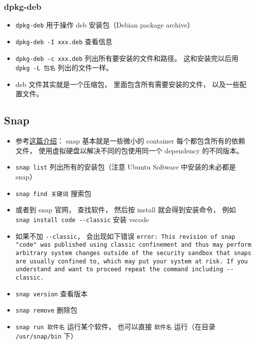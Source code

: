 \subsubsection{dpkg-deb}
\begin{itemize}
\item \verb|dpkg-deb| 用于操作 deb 安装包（Debian package archive）
\item \verb|dpkg-deb -I xxx.deb| 查看信息
\item \verb|dpkg-deb -c xxx.deb| 列出所有要安装的文件和路径。 这和安装完以后用 \verb|dpkg -L 包名| 列出的文件一样。
\item deb 文件其实就是一个压缩包， 里面包含所有需要安装的文件， 以及一些配置文件。
\end{itemize}


\subsection{Snap}
\begin{itemize}
\item 参考\href{https://www.howtogeek.com/660193/how-to-work-with-snap-packages-on-linux/}{这篇介绍}： snap 基本就是一些微小的 container 每个都包含所有的依赖文件， 使用虚拟硬盘以解决不同的包使用同一个 dependency 的不同版本。
\item \verb|snap list| 列出所有的安装包（注意 Ubuntu Software 中安装的未必都是 snap）
\item \verb|snap find 关键词| 搜索包
\item 或者到 snap 官网， 查找软件， 然后按 install 就会得到安装命令， 例如 \verb|snap install code --classic| 安装 vscode
\item 如果不加 \verb|--classic|， 会出现如下错误 \verb|error: This revision of snap "code" was published using classic confinement and thus may perform arbitrary system changes outside of the security sandbox that snaps are usually confined to, which may put your system at risk. If you understand and want to proceed repeat the command including --classic.|
\item \verb|snap version| 查看版本
\item \verb|snap remove| 删除包
\item \verb|snap run 软件名| 运行某个软件， 也可以直接 \verb|软件名| 运行（在目录 \verb|/usr/snap/bin| 下）
\end{itemize}

